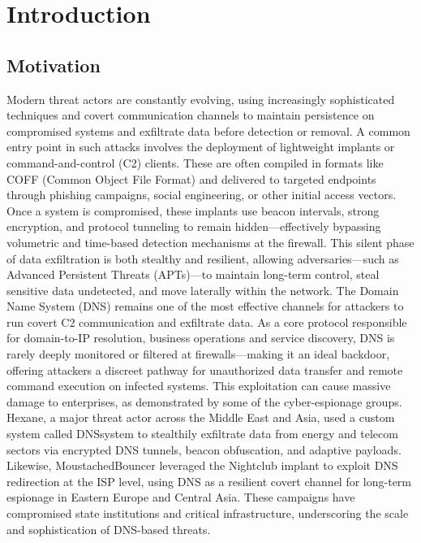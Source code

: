 \documentclass [11pt, proquest] {uwthesis}[2020/02/24]
\begin{document}
%
%

%
 
 
 
%
%

\textpages
 
 
\chapter {Introduction}
\section{Motivation}
Modern threat actors are constantly evolving, using increasingly sophisticated techniques and covert communication channels to maintain persistence on compromised systems and exfiltrate data before detection or removal. A common entry point in such attacks involves the deployment of lightweight implants or command-and-control (C2) clients. These are often compiled in formats like COFF (Common Object File Format) and delivered to targeted endpoints through phishing campaigns, social engineering, or other initial access vectors.
Once a system is compromised, these implants use beacon intervals, strong encryption, and protocol tunneling to remain hidden—effectively bypassing volumetric and time-based detection mechanisms at the firewall. This silent phase of data exfiltration is both stealthy and resilient, allowing adversaries—such as Advanced Persistent Threats (APTs)—to maintain long-term control, steal sensitive data undetected, and move laterally within the network.
The Domain Name System (DNS) remains one of the most effective channels for attackers to run covert C2 communication and exfiltrate data. As a core protocol responsible for domain-to-IP resolution, business operations and service discovery, DNS is rarely deeply monitored or filtered at firewalls—making it an ideal backdoor, offering attackers a discreet pathway for unauthorized data transfer and remote command execution on infected systems. 
This exploitation can cause massive damage to enterprises, as demonstrated by some of the cyber-espionage groups. Hexane, a major threat actor across the Middle East and Asia, used a custom system called DNSsystem to stealthily exfiltrate data from energy and telecom sectors via encrypted DNS tunnels, beacon obfuscation, and adaptive payloads. Likewise, MoustachedBouncer leveraged the Nightclub implant to exploit DNS redirection at the ISP level, using DNS as a resilient covert channel for long-term espionage in Eastern Europe and Central Asia. These campaigns have compromised state institutions and critical infrastructure, underscoring the scale and sophistication of DNS-based threats.
\end{document}
